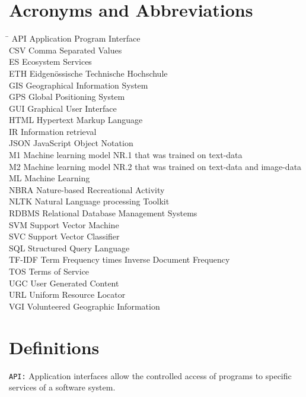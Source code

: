 \section*{Acronyms and Abbreviations}
\begin{tabbing}
 \hspace*{1.6cm}  \= \kill
 API \> Application Program Interface \\
 CSV \> Comma Separated Values \\
 ES \> Ecosystem Services \\
 ETH \> Eidgen\"{o}ssische Technische Hochschule \\
 GIS \> Geographical Information System \\
 GPS \> Global Positioning System \\
 GUI \> Graphical User Interface \\
 HTML \> Hypertext Markup Language \\
 IR \> Information retrieval \\
 JSON \> JavaScript Object Notation \\
 M1 \> Machine learning model NR.1 that was trained on text-data \\
 M2 \> Machine learning model NR.2 that was trained on text-data and image-data \\
 ML \> Machine Learning \\
 NBRA \> Nature-based Recreational Activity \\
 NLTK \> Natural Language processing Toolkit \\ 
 RDBMS \> Relational Database Management Systems \\
 SVM \> Support Vector Machine \\
 SVC \> Support Vector Classifier \\
 SQL \> Structured Query Language \\
 TF-IDF \> Term Frequency times Inverse Document Frequency \\
 TOS \> Terms of Service \\
 UGC \> User Generated Content \\
 URL \> Uniform Resource Locator \\ 
 VGI \> Volunteered Geographic Information
\end{tabbing}

\section*{Definitions} \label{definitions}
\texttt{API:} Application interfaces allow the controlled access of programs to specific services of a software system. 
\newline

